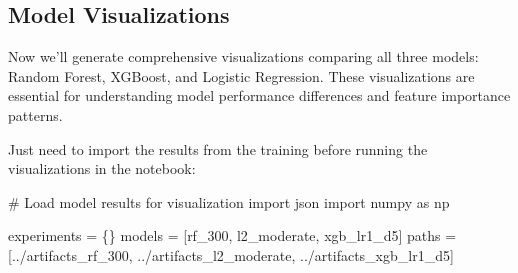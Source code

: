 \documentclass[
  letterpaper,
  DIV=11,
  numbers=noendperiod]{scrartcl}
\newenvironment{Shaded}{\begin{snugshade}}{\end{snugshade}}
\newcommand{\CommentTok}[1]{\textcolor[rgb]{0.37,0.37,0.37}{#1}}
\newcommand{\ImportTok}[1]{\textcolor[rgb]{0.00,0.46,0.62}{#1}}
\newcommand{\NormalTok}[1]{\textcolor[rgb]{0.00,0.23,0.31}{#1}}
\newcommand{\OperatorTok}[1]{\textcolor[rgb]{0.37,0.37,0.37}{#1}}
\newcommand{\StringTok}[1]{\textcolor[rgb]{0.13,0.47,0.30}{#1}}
\renewenvironment{Shaded}{%
  \begin{tcolorbox}[%
    enhanced,%
    colback=codebg,%
    colframe=codebg,%
    borderline west={3pt}{0pt}{sectionblue},%
    fontupper=\small\ttfamily,%
    boxrule=0pt,%
    arc=0pt,%
    boxsep=5pt,%
    left=2mm,%
    right=2mm,%
    top=2mm,%
    bottom=2mm%
  ]%
}{%
  \end{tcolorbox}%
}
\begin{document}
\subsection{Model Visualizations}\label{model-visualizations}

Now we'll generate comprehensive visualizations comparing all three
models: Random Forest, XGBoost, and Logistic Regression. These
visualizations are essential for understanding model performance
differences and feature importance patterns.

Just need to import the results from the training before running the
visualizations in the notebook:

\begin{Shaded}
\begin{Highlighting}[]
\CommentTok{\# Load model results for visualization}
\ImportTok{import}\NormalTok{ json}
\ImportTok{import}\NormalTok{ numpy }\ImportTok{as}\NormalTok{ np}

\NormalTok{experiments }\OperatorTok{=}\NormalTok{ \{\}}
\NormalTok{models }\OperatorTok{=}\NormalTok{ [}\StringTok{\textquotesingle{}rf\_300\textquotesingle{}}\NormalTok{, }\StringTok{\textquotesingle{}l2\_moderate\textquotesingle{}}\NormalTok{, }\StringTok{\textquotesingle{}xgb\_lr1\_d5\textquotesingle{}}\NormalTok{]}
\NormalTok{paths }\OperatorTok{=}\NormalTok{ [}\StringTok{\textquotesingle{}../artifacts\_rf\_300\textquotesingle{}}\NormalTok{, }\StringTok{\textquotesingle{}../artifacts\_l2\_moderate\textquotesingle{}}\NormalTok{, }\StringTok{\textquotesingle{}../artifacts\_xgb\_lr1\_d5\textquotesingle{}}\NormalTok{]}


\end{Highlighting}
\end{Shaded}
\end{document}
